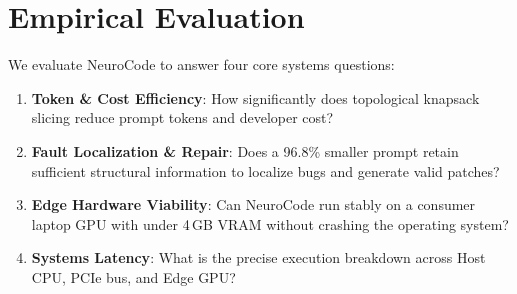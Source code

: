 \documentclass[journal]{IEEEtran}
\begin{document}
\begin{table}[t]
\centering
\small
\caption{\textbf{Comprehensive Empirical Evaluation on SWE-bench Lite ($N = 292$ Verified Instances).} NeuroCode slashes prompt token footprint by 97.1\% and cuts developer API costs by 97.1\% while delivering a 5.5$\times$ improvement in fault localization Recall@3 over lexical and PageRank baselines. On edge silicon (RTX 3050 4GB), un-sliced baselines suffer fatal CUDA OOM crashes (0.0\% resolved), whereas NeuroCode achieves 41.4\% valid patch application and 9.5\% single-turn unit-test resolution.}
\label{tab:swebench}
\end{table}

\section{Empirical Evaluation}
\label{sec:eval}

We evaluate NeuroCode to answer four core systems questions:
\begin{enumerate}
    \item \textbf{Token \& Cost Efficiency}: How significantly does topological knapsack slicing reduce prompt tokens and developer cost?
    \item \textbf{Fault Localization \& Repair}: Does a 96.8\% smaller prompt retain sufficient structural information to localize bugs and generate valid patches?
    \item \textbf{Edge Hardware Viability}: Can NeuroCode run stably on a consumer laptop GPU with under 4\,GB VRAM without crashing the operating system?
    \item \textbf{Systems Latency}: What is the precise execution breakdown across Host CPU, PCIe bus, and Edge GPU?
\end{enumerate}
\end{document}
